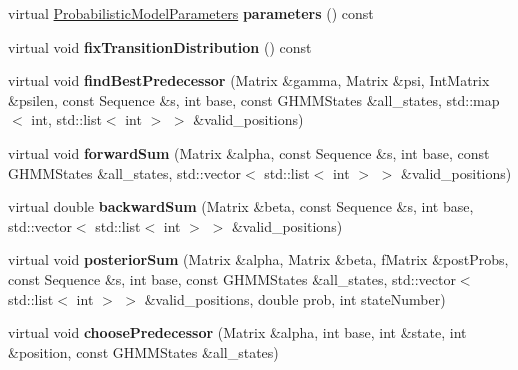 \begin{DoxyCompactItemize}
\item 
\mbox{\label{classtops_1_1GHMMSignalState_a43a5c14c3c5a5e2278e86eac5342eb92}} 
virtual \hyperlink{classtops_1_1ProbabilisticModelParameters}{Probabilistic\+Model\+Parameters} {\bfseries parameters} () const
\item 
\mbox{\label{classtops_1_1GHMMSignalState_afdea9614f4a1ba184c1b51a38e4f0d7b}} 
virtual void {\bfseries fix\+Transition\+Distribution} () const
\item 
\mbox{\label{classtops_1_1GHMMSignalState_a370aa0c3dcff2ad533d3e0948c4e44e1}} 
virtual void {\bfseries find\+Best\+Predecessor} (Matrix \&gamma, Matrix \&psi, Int\+Matrix \&psilen, const Sequence \&s, int base, const G\+H\+M\+M\+States \&all\+\_\+states, std\+::map$<$ int, std\+::list$<$ int $>$ $>$ \&valid\+\_\+positions)
\item 
\mbox{\label{classtops_1_1GHMMSignalState_ab2d59a2b4f8f7acf7dce68735f279e16}} 
virtual void {\bfseries forward\+Sum} (Matrix \&alpha, const Sequence \&s, int base, const G\+H\+M\+M\+States \&all\+\_\+states, std\+::vector$<$ std\+::list$<$ int $>$ $>$ \&valid\+\_\+positions)
\item 
\mbox{\label{classtops_1_1GHMMSignalState_ab62dc024ea9a723561d7c25e7d65eda2}} 
virtual double {\bfseries backward\+Sum} (Matrix \&beta, const Sequence \&s, int base, std\+::vector$<$ std\+::list$<$ int $>$ $>$ \&valid\+\_\+positions)
\item 
\mbox{\label{classtops_1_1GHMMSignalState_ac8fad3365487d4be9bf7c0015f4d4cc2}} 
virtual void {\bfseries posterior\+Sum} (Matrix \&alpha, Matrix \&beta, f\+Matrix \&post\+Probs, const Sequence \&s, int base, const G\+H\+M\+M\+States \&all\+\_\+states, std\+::vector$<$ std\+::list$<$ int $>$ $>$ \&valid\+\_\+positions, double prob, int state\+Number)
\item 
\mbox{\label{classtops_1_1GHMMSignalState_adc33b138f58cb0fc4ca6d2986e83a839}} 
virtual void {\bfseries choose\+Predecessor} (Matrix \&alpha, int base, int \&state, int \&position, const G\+H\+M\+M\+States \&all\+\_\+states)
\end{DoxyCompactItemize}
